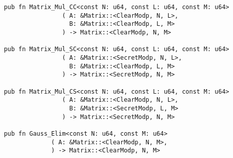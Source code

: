 \begin{lstlisting}
    pub fn Matrix_Mul_CC<const N: u64, const L: u64, const M: u64>
                    ( A: &Matrix::<ClearModp, N, L>,
                      B: &Matrix::<ClearModp, L, M>
                    ) -> Matrix::<ClearModp, N, M> 

    pub fn Matrix_Mul_SC<const N: u64, const L: u64, const M: u64>
                    ( A: &Matrix::<SecretModp, N, L>,
                      B: &Matrix::<ClearModp, L, M>
                    ) -> Matrix::<SecretModp, N, M>

    pub fn Matrix_Mul_CS<const N: u64, const L: u64, const M: u64>
                    ( A: &Matrix::<ClearModp, N, L>,
                      B: &Matrix::<SecretModp, L, M>
                    ) -> Matrix::<SecretModp, N, M>

    pub fn Gauss_Elim<const N: u64, const M: u64>
                 ( A: &Matrix::<ClearModp, N, M>,
                 ) -> Matrix::<ClearModp, N, M>
\end{lstlisting}

